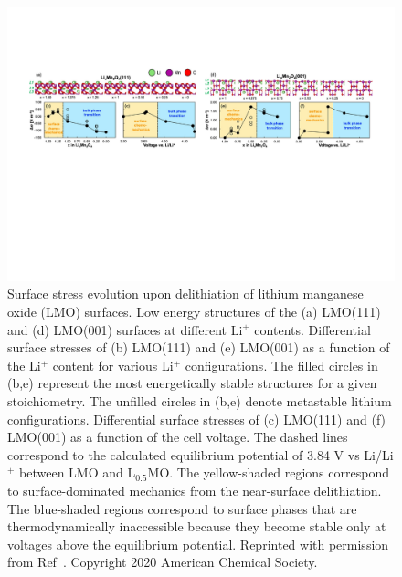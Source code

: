\documentclass[../main.tex]{subfiles}
\begin{document}
\begin{figure}
    \centering
    \includegraphics[scale=0.6]{figures/cathode_surface_stress.pdf}
    \caption{Surface stress evolution upon delithiation of lithium manganese oxide (LMO) surfaces. Low energy structures of the (a) LMO(111) and (d) LMO(001) surfaces at different Li$^+$ contents. Differential surface stresses of (b) LMO(111) and (e) LMO(001) as a function of the Li$^+$ content for various Li$^+$ configurations. The filled circles in (b,e) represent the most energetically stable structures for a given stoichiometry. The unfilled circles in (b,e) denote metastable lithium configurations. Differential surface stresses of (c) LMO(111) and (f) LMO(001) as a function of the cell voltage. The dashed lines correspond to the calculated equilibrium potential of 3.84 V vs Li/Li$^+$ between LMO and L$_{0.5}$MO. The yellow-shaded regions correspond to surface-dominated mechanics from the near-surface delithiation. The blue-shaded regions correspond to surface phases that are thermodynamically inaccessible because they become stable only at voltages above the equilibrium potential. Reprinted with permission from Ref~. Copyright 2020 American Chemical Society.}
    \label{fig:cathode_surface_stress}
\end{figure}
\end{document}
